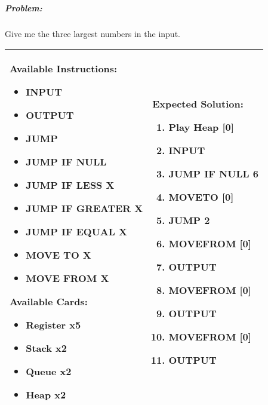 \subparagraph{Problem:} Give me the three largest numbers in the input.

\begin{center}
    \begin{tabular}{ | m{6cm} | m{8cm} | } 
        \hline
            \textbf{Available Instructions:} 
            \begin{itemize}
                \setlength\itemsep{-.35em}
                \item INPUT
                \item OUTPUT
                \item JUMP
                \item JUMP IF NULL
                \item JUMP IF LESS X
                \item JUMP IF GREATER X
	     \item JUMP IF EQUAL X
                \item MOVE TO X
                \item MOVE FROM X
            \end{itemize}
            \textbf{Available Cards:} 
            \begin{itemize}
                \setlength\itemsep{-.35em}
                \item Register x5
                \item Stack x2
		\item Queue x2
		\item Heap x2
            \end{itemize}& 
            \textbf{Expected Solution:} 
            \begin{enumerate}
                \setlength\itemsep{-.60em}
                \item Play Heap [0]
                \item INPUT
                \item JUMP IF NULL 6
                \item MOVETO [0]
                \item JUMP 2
                \item MOVEFROM [0]
                \item OUTPUT
                \item MOVEFROM [0]
                \item OUTPUT
                \item MOVEFROM [0]
                \item OUTPUT
            \end{enumerate}
            \\
        \hline
    \end{tabular}
\end{center}


